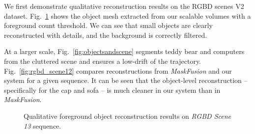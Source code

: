 We first demonstrate qualitative reconstruction results on the RGBD scenes V2 dataset.  Fig.~\ref{fig:rgbd_scene13} shows the object mesh extracted from our scalable volumes with a foreground count threshold. We can see that small objects are clearly reconstructed with details, and the background is correctly filtered.

At a larger scale, Fig.~\ref{fig:objectsandscene} segments teddy bear and computers from the cluttered scene and ensures a low-drift of the trajectory. Fig.~\ref{fig:rgbd_scene12} compares reconstructions from \textit{MaskFusion} \cite{runzMaskFusionRealTimeRecognition2018} and our system for a given sequence. It can be seen that the object-level reconstruction -- specifically for the cap and sofa -- is much cleaner in our system than in \textit{MaskFusion}.

\begin{figure}[t!]
    \centering
    \caption{Qualitative foreground object reconstruction results on \emph{RGBD Scene 13} sequence.}
    \vspace*{-1em}
    \label{fig:rgbd_scene13}
\end{figure}

